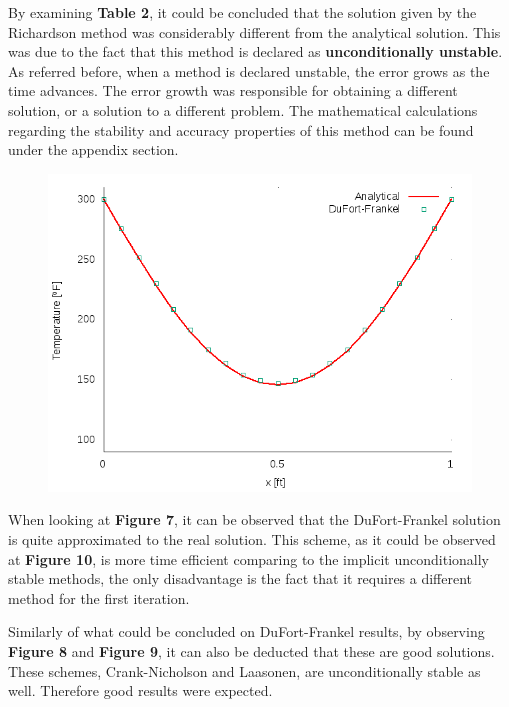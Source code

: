 \documentclass[12pt]{article}
\begin{document}
\par By examining \textbf{Table 2}, it could be concluded that the solution given by the Richardson method  was considerably different from the analytical solution. This was due to the fact that this method is declared as \textbf{unconditionally unstable}.  As referred before, when a method is declared unstable, the error grows as the time advances. The error growth was responsible for obtaining a different solution, or a solution to a different problem. The mathematical calculations regarding the stability and accuracy properties of this method can be found under the appendix section. 

\begin{figure}[!htb]
  \centering
  \includegraphics[width=.5\linewidth]{DuFort-Frankelt_0_5.png}
\end{figure}

\par When looking at \textbf{Figure 7}, it can be observed that the DuFort-Frankel solution is quite approximated to the real solution. This scheme, as it could be observed at \textbf{Figure 10}, is more time efficient comparing to the implicit unconditionally stable methods, the only disadvantage is the fact that it requires a different method for the first iteration.

\par Similarly of what could be concluded on DuFort-Frankel results, by observing \textbf{Figure 8} and \textbf{Figure 9}, it can also be deducted that these are good solutions. These schemes, Crank-Nicholson and Laasonen, are unconditionally stable as well. Therefore good results were expected.
\end{document}
